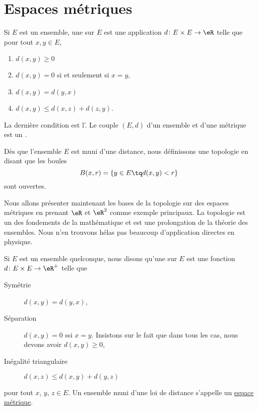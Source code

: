 \section{Espaces métriques}

Si $E$ est un ensemble, une  sur $E$ est une application $d\colon E\times E\to \eR$ telle que pour tout $x,y\in E$,
\begin{enumerate}

\item
$d(x,y)\geq 0$

\item
$d(x,y)=0$ si et seulement si $x=y$,

\item
$d(x,y)=d(y,x)$

\item
$d(x,y)\leq d(x,z)+d(z,y)$.

\end{enumerate}
La dernière condition est l'. Le couple $(E,d)$ d'un ensemble et d'une métrique est un .

Dès que l'ensemble $E$ est muni d'une distance, nous définissons une topologie en disant que les boules
\begin{equation}
	B(x,r)=\{ y\in E\tq d(x,y)<r \}
\end{equation}
sont ouvertes.



Nous allons présenter maintenant les bases de la topologie sur des espaces métriques en prenant $\eR$ et $\eR^2$ comme exemple principaux. La topologie est un des fondements de la mathématique et est une prolongation de la théorie des ensembles. Nous n'en trouvons hélas pas beaucoup d'application directes en physique.

Si $E$ est un ensemble quelconque, nous disons qu'une  sur $E$ est une fonction $d\colon E\times E\to \eR^+$ telle que
\begin{description}
\item[Symétrie] $d(x,y)=d(y,x)$,
\item[Séparation] $d(x,y)=0$ ssi $x=y$. Insistons sur le fait que dans tous les cas, nous devons avoir $d(x,y)\geq 0$,
\item[Inégalité triangulaire] $d(x,z)\leq d(x,y)+d(y,z)$
\end{description}
pour tout $x$, $y$, $z\in E$. Un ensemble muni d'une loi de distance s'appelle un \href{http://fr.wikipedia.org/wiki/Espace_métrique}{espace métrique}.

